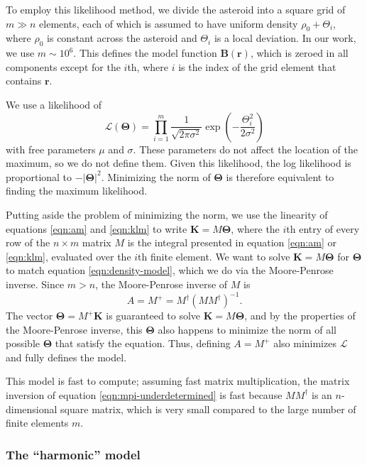\documentclass[fleqn,usenatbib]{mnras}
\newcommand{\parens}[1]{\left( #1 \right)}
\begin{document}
To employ this likelihood method, we divide the asteroid into a square grid of $m \gg n$ elements, each of which is assumed to have uniform density $\rho_0+\Theta_i$, where $\rho_0$ is constant across the asteroid and $\Theta_i$ is a local deviation. In our work, we use $m \sim 10^{6}$. This defines the model function $\bm B(\bm r)$, which is zeroed in all components except for the $i$th, where $i$ is the index of the grid element that contains $\bm r$.

We use a likelihood of 
\begin{equation}
  \mathcal{L}(\bm \Theta) = \prod_{i=1}^m \frac{1}{\sqrt{2\pi \sigma^2}} \exp\parens{-\frac{\Theta_i^2}{2 \sigma^2}}
\end{equation}
with free parameters $\mu$ and $\sigma$. These parameters do not affect the location of the maximum, so we do not define them. Given this likelihood, the log likelihood is proportional to $-|\bm \Theta|^2$. Minimizing the norm of $\bm \Theta$ is therefore equivalent to finding the maximum likelihood.

Putting aside the problem of minimizing the norm, we use the linearity of equations \ref{eqn:am} and \ref{eqn:klm} to write $\bm K = M \bm \Theta$, where the $i$th entry of every row of the $n\times m$ matrix $M$ is the integral presented in equation \ref{eqn:am} or \ref{eqn:klm}, evaluated over the $i$th finite element. We want to solve $\bm K = M \bm \Theta$ for $\bm \Theta$ to match equation \ref{eqn:density-model}, which we do via the Moore-Penrose inverse. Since $m>n$, the Moore-Penrose inverse of $M$ is
\begin{equation}
  A=M^+ = M^\dagger(MM^\dagger)^{-1}.
  \label{eqn:mpi-underdetermined}
\end{equation}
The vector $\bm \Theta=M^+\bm K$ is guaranteed to solve $\bm K = M \bm \Theta$, and by the properties of the Moore-Penrose inverse, this $\bm \Theta$ also happens to minimize the norm of all possible $\bm \Theta$ that satisfy the equation. Thus, defining $A=M^+$ also minimizes $\mathcal{L}$ and fully defines the model.

This model is fast to compute; assuming fast matrix multiplication, the matrix inversion of equation \ref{eqn:mpi-underdetermined} is fast because $MM^\dagger$ is an $n$-dimensional square matrix, which is very small compared to the large number of finite elements $m$.




\subsubsection{The ``harmonic'' model}
\label{sec:harmonic}
\end{document}
